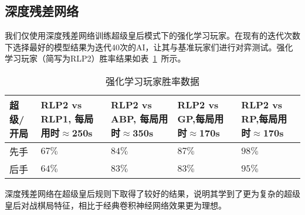 \subsection{深度残差网络}
我们仅使用深度残差网络训练超级皇后模式下的强化学习玩家。在现有的迭代次数下选择最好的模型结果为迭代40次的AI，让其与基准玩家们进行对弈测试。强化学习玩家（简写为RLP2）胜率结果如表~\ref{table:airesult2}~所示。
\begin{table}[H]
    \centering
    \caption[airesult2]{强化学习玩家胜率数据}
    \begin{tabular}{p{2cm}<{\centering} p{3cm}<{\centering} p{3cm}<{\centering} p{3cm}<{\centering} p{3cm}<{\centering}}
    \hline
    超级/开局 & RLP2 vs RLP1, 每局用时$\approx$250s & RLP2 vs ABP, 每局用时$\approx$350s & RLP2 vs GP,每局用时$\approx$170s & RLP2 vs RP,每局用时$\approx$170s \\ \hline
    先手 & $67\%$ & $84\%$ & $87\%$ & $98\%$\\ 
    后手 & $64\%$ & $83\%$ & $83\%$ & $95\%$\\ \hline
    \end{tabular}
    \label{table:airesult2}
  \end{table}

深度残差网络在超级皇后规则下取得了较好的结果，说明其学到了更为复杂的超级皇后对战棋局特征，相比于经典卷积神经网络效果更为理想。

